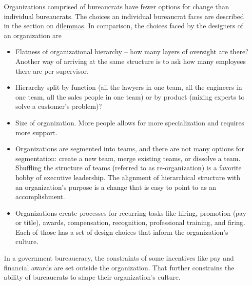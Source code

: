 Organizations comprised of bureaucrats have fewer options for change than individual bureaucrats. The choices an individual bureaucrat faces are described in the section on 
\hyperref[sec:dilemma-trilemma]{dilemmas}.
In comparison, the choices faced by the designers of an organization are
\begin{itemize}
    \item Flatness of organizational hierarchy -- how many layers of oversight are there? Another way of arriving at the same structure is to ask how many employees there are per supervisor.
    \item Hierarchy split by function (all the lawyers in one team, all the engineers in one team, all the sales people in one team) or by product (mixing experts to solve a customer's problem)?

    
    \item Size of organization. More people allows for more specialization and requires more support. 
    \item Organizations are segmented into teams, and there are not many options for segmentation: create a new team, merge existing teams, or dissolve a team. Shuffling the structure of teams (referred to as re-organization) is a favorite hobby of executive leadership. The alignment of hierarchical structure with an organization's purpose is a change that is easy to point to as an accomplishment. 

    
    \item Organizations create processes for recurring tasks like hiring, promotion (pay or title), awards, compensation, recognition, professional training, and firing. Each of those has a set of design choices that inform the organization's culture.
\end{itemize}
In a government bureaucracy, the constraints of some incentives like pay and financial awards are set outside the organization. That further constrains the ability of bureaucrats to shape their organization's culture.

